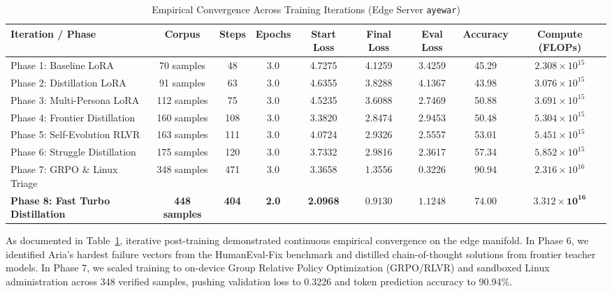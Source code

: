 \documentclass[10pt,a4paper]{article}
\begin{document}
\begin{table}[h!]
\centering
\caption{Empirical Convergence Across Training Iterations (Edge Server \texttt{ayewar})}
\label{tab:convergence}
\footnotesize
\setlength{\tabcolsep}{2.2pt}
\begin{tabular}{@{}lcccccccc@{}}
\toprule
\textbf{Iteration / Phase} & \textbf{Corpus} & \textbf{Steps} & \textbf{Epochs} & \textbf{Start Loss} & \textbf{Final Loss} & \textbf{Eval Loss} & \textbf{Accuracy} & \textbf{Compute (FLOPs)} \\ \midrule
Phase 1: Baseline LoRA & 70 samples & 48 & 3.0 & 4.7275 & 4.1259 & 3.4259 & 45.29 & $2.308 \times 10^{15}$ \\
Phase 2: Distillation LoRA & 91 samples & 63 & 3.0 & 4.6355 & 3.8288 & 4.1367 & 43.98 & $3.076 \times 10^{15}$ \\
Phase 3: Multi-Persona LoRA & 112 samples & 75 & 3.0 & 4.5235 & 3.6088 & 2.7469 & 50.88 & $3.691 \times 10^{15}$ \\
Phase 4: Frontier Distillation & 160 samples & 108 & 3.0 & 3.3820 & 2.8474 & 2.9453 & 50.48 & $5.304 \times 10^{15}$ \\
Phase 5: Self-Evolution RLVR & 163 samples & 111 & 3.0 & 4.0724 & 2.9326 & 2.5557 & 53.01 & $5.451 \times 10^{15}$ \\
Phase 6: Struggle Distillation & 175 samples & 120 & 3.0 & 3.7332 & 2.9816 & 2.3617 & 57.34 & $5.852 \times 10^{15}$ \\
Phase 7: GRPO \& Linux Triage & 348 samples & 471 & 3.0 & 3.3658 & 1.3556 & 0.3226 & 90.94 & $2.316 \times 10^{16}$ \\
\textbf{Phase 8: Fast Turbo Distillation} & \textbf{448 samples} & \textbf{404} & \textbf{2.0} & \textbf{2.0968} & $\mathbf{0.9130}$ & $\mathbf{1.1248}$ & $\mathbf{74.00}$ & $\mathbf{3.312 \times 10^{16}}$ \\ \bottomrule
\end{tabular}
\end{table}

As documented in Table~\ref{tab:convergence}, iterative post-training demonstrated continuous empirical convergence on the edge manifold. In Phase 6, we identified Aria's hardest failure vectors from the HumanEval-Fix benchmark and distilled chain-of-thought solutions from frontier teacher models. In Phase 7, we scaled training to on-device Group Relative Policy Optimization (GRPO/RLVR) and sandboxed Linux administration across 348 verified samples, pushing validation loss to 0.3226 and token prediction accuracy to 90.94\%.
\end{document}
